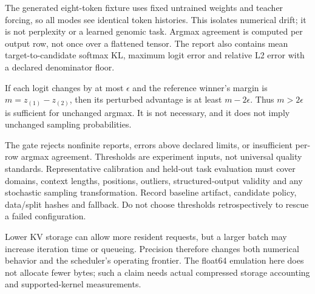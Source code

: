 \begin{center}\end{center}

The generated eight-token fixture uses fixed untrained weights and teacher
forcing, so all modes see identical token histories. This isolates numerical
drift; it is not perplexity or a learned genomic task. Argmax agreement is
computed per output row, not once over a flattened tensor. The report also
contains mean target-to-candidate softmax KL, maximum logit error and relative
L2 error with a declared denominator floor.

If each logit changes by at most $\epsilon$ and the reference winner's
margin is $m=z_{(1)}-z_{(2)}$, then its perturbed advantage is at least
$m-2\epsilon$. Thus $m>2\epsilon$ is sufficient for unchanged argmax.
It is not necessary, and it does not imply unchanged sampling probabilities.


The gate rejects nonfinite reports, errors above declared limits, or
insufficient per-row argmax agreement. Thresholds are experiment inputs,
not universal quality standards. Representative calibration and held-out
task evaluation must cover domains, context lengths, positions, outliers,
structured-output validity and any stochastic sampling transformation.
Record baseline artifact, candidate policy, data/split hashes and fallback.
Do not choose thresholds retrospectively to rescue a failed configuration.

Lower KV storage can allow more resident requests, but a larger batch may
increase iteration time or queueing. Precision therefore changes both
numerical behavior and the scheduler's operating frontier. The float64
emulation here does not allocate fewer bytes; such a claim needs actual
compressed storage accounting and supported-kernel measurements.

